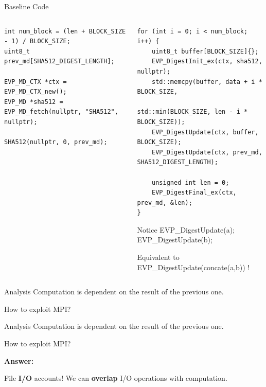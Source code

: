 \begin{frame}[fragile]{Baseline Code}
    \begin{columns}
    \begin{column}{.5\textwidth}
\begin{verbatim}
int num_block = (len + BLOCK_SIZE - 1) / BLOCK_SIZE;
uint8_t prev_md[SHA512_DIGEST_LENGTH];

EVP_MD_CTX *ctx = EVP_MD_CTX_new();
EVP_MD *sha512 = EVP_MD_fetch(nullptr, "SHA512", nullptr);

SHA512(nullptr, 0, prev_md);
\end{verbatim}
        \end{column}
        
        \begin{column}{.5\textwidth}
        \begin{verbatim}
for (int i = 0; i < num_block; i++) {
    uint8_t buffer[BLOCK_SIZE]{};
    EVP_DigestInit_ex(ctx, sha512, nullptr);
    std::memcpy(buffer, data + i * BLOCK_SIZE,
                std::min(BLOCK_SIZE, len - i * BLOCK_SIZE));
    EVP_DigestUpdate(ctx, buffer, BLOCK_SIZE);
    EVP_DigestUpdate(ctx, prev_md, SHA512_DIGEST_LENGTH);

    unsigned int len = 0;
    EVP_DigestFinal_ex(ctx, prev_md, &len);
}
              \end{verbatim}
        
        \begin{block}{\scriptsize Notice}
        \scriptsize
            EVP\_DigestUpdate(a);
            EVP\_DigestUpdate(b);
            
            Equivalent to EVP\_DigestUpdate(concate(a,b)) !
        \end{block}
        \end{column}

    \end{columns}
    
\end{frame}

\begin{frame}{Analysis}
    Computation is dependent on the result of the previous one.
    
    How to exploit MPI?

\end{frame}

\begin{frame}{Analysis}
    Computation is dependent on the result of the previous one.
    
    How to exploit MPI?

    \vspace{1cm}

    \textbf{Answer:}
    
    File \textbf{I/O} accounts! We can \textbf{overlap} I/O operations with computation.
\end{frame}

